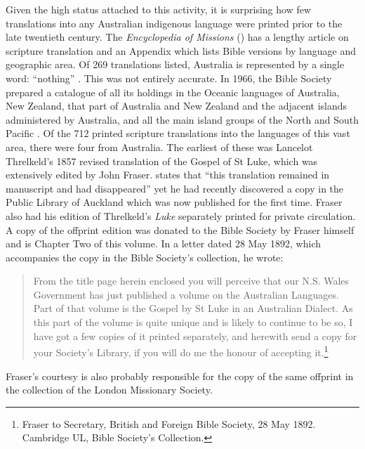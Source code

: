 {Given the high status attached to this activity, it is surprising how few translations into any Australian indigenous language were printed prior to the late twentieth century. The \textit{Encyclopedia of Missions} (\citeyear[573]{bliss_encyclopaedia_1891}) has a lengthy article on scripture translation and an Appendix which lists Bible versions by language and geographic area. Of 269 translations listed, Australia is represented by a single word: “nothing” \citep[573]{bliss_encyclopaedia_1891}. This was not entirely accurate. In 1966, the Bible Society prepared a catalogue of all its holdings in the Oceanic languages of Australia, New Zealand, that part of Australia and New Zealand and the adjacent islands administered by Australia, and all the main island groups of the North and South Pacific \citep{dance_oceanic_1963}. Of the 712 printed scripture translations into the languages of this vast area, there were four from Australia. The earliest of these was Lancelot Threlkeld’s 1857 revised translation of the Gospel of St Luke, which was extensively edited by John Fraser. \citet[xi]{fraser_australian_1892} states that “this translation remained in manuscript and had disappeared” yet he had recently discovered a copy in the Public Library of Auckland which was now published for the first time. Fraser also had his edition of Threlkeld’s \textit{Luke} separately printed for private circulation. A copy of the offprint edition was donated to the Bible Society by Fraser himself and is Chapter Two of this volume. In a letter dated 28 May 1892, which accompanies the copy in the Bible Society’s collection, he wrote:

\begin{quote}
     From the title page herein enclosed you will perceive that our N.S. Wales Government has just published a volume on the Australian Languages. Part of that volume is the Gospel by St Luke in an Australian Dialect. As this part of the volume is quite unique and is likely to continue to be so, I have got a few copies of it printed separately, and herewith send a copy for your Society’s Library, if you will do me the honour of accepting it.\footnote{Fraser to Secretary, British and Foreign Bible Society, 28 May 1892. Cambridge UL, Bible Society’s Collection.}
\end{quote}

Fraser’s courtesy is also probably responsible for the copy of the same offprint in the collection of the London Missionary Society.

}
